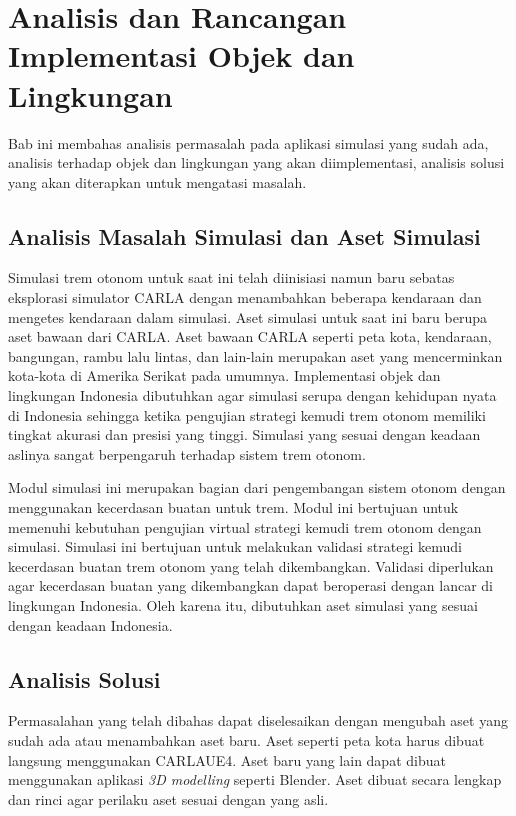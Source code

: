 \chapter{Analisis dan Rancangan Implementasi Objek dan Lingkungan}


Bab ini membahas analisis permasalah pada aplikasi simulasi yang sudah ada,
analisis terhadap objek dan lingkungan yang akan diimplementasi, analisis solusi
yang akan diterapkan untuk mengatasi masalah.

\section{Analisis Masalah Simulasi dan Aset Simulasi}
Simulasi trem otonom untuk saat ini telah diinisiasi namun baru sebatas
eksplorasi simulator CARLA dengan menambahkan beberapa kendaraan dan mengetes
kendaraan dalam simulasi. Aset simulasi untuk saat ini baru berupa aset bawaan
dari CARLA. Aset bawaan CARLA seperti peta kota, kendaraan, bangungan, rambu
lalu lintas, dan lain-lain merupakan aset yang mencerminkan kota-kota di Amerika
Serikat pada umumnya. Implementasi objek dan lingkungan Indonesia dibutuhkan
agar simulasi serupa dengan kehidupan nyata di Indonesia sehingga ketika
pengujian strategi kemudi trem otonom memiliki tingkat akurasi dan presisi yang
tinggi. Simulasi yang sesuai dengan keadaan aslinya sangat berpengaruh terhadap
sistem trem otonom.

Modul simulasi ini merupakan bagian dari pengembangan sistem otonom dengan
menggunakan kecerdasan buatan untuk trem. Modul ini bertujuan untuk memenuhi
kebutuhan pengujian virtual strategi kemudi trem otonom dengan simulasi.
Simulasi ini bertujuan untuk melakukan validasi strategi kemudi kecerdasan
buatan trem otonom yang telah dikembangkan. Validasi diperlukan agar kecerdasan
buatan yang dikembangkan dapat beroperasi dengan lancar di lingkungan Indonesia.
Oleh karena itu, dibutuhkan aset simulasi yang sesuai dengan keadaan Indonesia.

\section{Analisis Solusi}
Permasalahan yang telah dibahas dapat diselesaikan dengan mengubah aset yang
sudah ada atau menambahkan aset baru. Aset seperti peta kota harus dibuat
langsung menggunakan CARLAUE4. Aset baru yang lain dapat dibuat menggunakan
aplikasi \textit{3D modelling} seperti Blender. Aset dibuat secara lengkap dan
rinci agar perilaku aset sesuai dengan yang asli.

